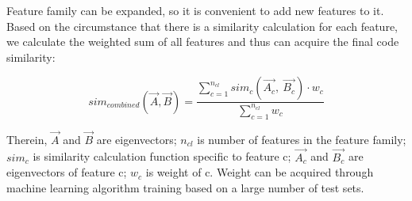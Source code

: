 Feature family can be expanded, so it is convenient to add new features to it. Based on the circumstance that there is a similarity calculation for each feature, we calculate the weighted sum of all features and thus can acquire the final code similarity:

\begin{equation}
	sim_{combined}(\vec{A}, \vec{B})=\frac{\sum_{c=1}^{n_{cl}}sim_{c}(\vec{A_c},~\vec{B_c})\cdot w_{c}}{\sum_{c=1}^{n_{cl}}w_{c}}
\end{equation}

Therein, $\vec{A}$ and $\vec{B}$ are eigenvectors; $n_{cl}$ is number of features in the feature family; $sim_{c}$ is similarity calculation function specific to feature c; $\vec{A_c}$ and $\vec{B_c}$ are eigenvectors of feature c; $w_{c}$ is weight of c. Weight can be acquired through machine learning algorithm training based on a large number of test sets.